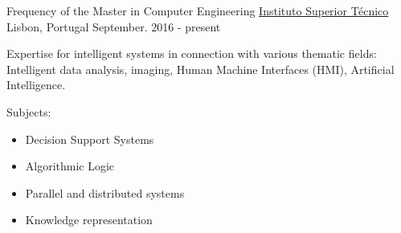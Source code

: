 


\begin{cventries}


\cventry
{Frequency of the Master in Computer Engineering} %
{\href{https://tecnico.ulisboa.pt/en/}{Instituto Superior Técnico}} %
{Lisbon, Portugal} %
{September. 2016 - present} %
{  %
\begin{cvitems}
\item {Expertise for intelligent systems in connection with various thematic fields: Intelligent data analysis, imaging, Human Machine Interfaces (HMI), Artificial Intelligence.}
\item{Subjects:}
\begin{itemize}
\item Decision Support Systems
\item Algorithmic Logic
\item Parallel and distributed systems
\item Knowledge representation
\end{itemize}
\end{cvitems}
}



\end{cventries}
